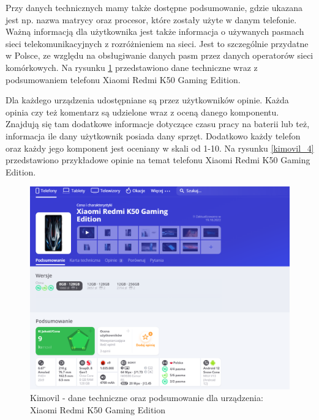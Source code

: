 Przy danych technicznych mamy także dostępne podsumowanie, gdzie ukazana jest np. nazwa matrycy oraz procesor, które zostały użyte w danym telefonie. Ważną informacją dla użytkownika jest także informacja o używanych pasmach sieci telekomunikacyjnych z rozróżnieniem na sieci. Jest to szczególnie przydatne w Polsce, ze względu na obsługiwanie danych pasm przez danych operatorów sieci komórkowych. Na rysunku \ref*{kimovil_3} przedstawiono dane techniczne wraz z podsumowaniem telefonu Xiaomi Redmi K50 Gaming Edition.

Dla każdego urządzenia udostępniane są przez użytkowników opinie. Każda opinia czy też komentarz są udzielone wraz z oceną danego komponentu. Znajdują się tam dodatkowe informacje dotyczące czasu pracy na baterii lub też, informacja ile dany użytkownik posiada dany sprzęt. Dodatkowo każdy telefon oraz każdy jego komponent jest oceniany w skali od 1-10. Na rysunku \ref*{kimovil_4} przedstawiono przykładowe opinie na temat telefonu Xiaomi Redmi K50 Gaming Edition.
\begin{figure}[ht]
    \centering
    \includegraphics[scale=0.45]{img/Kimovil/kimovilDetails.png}
    \caption{Kimovil - dane techniczne oraz podsumowanie dla urządzenia: Xiaomi Redmi K50 Gaming Edition}
    \label{kimovil_3}
\end{figure}
